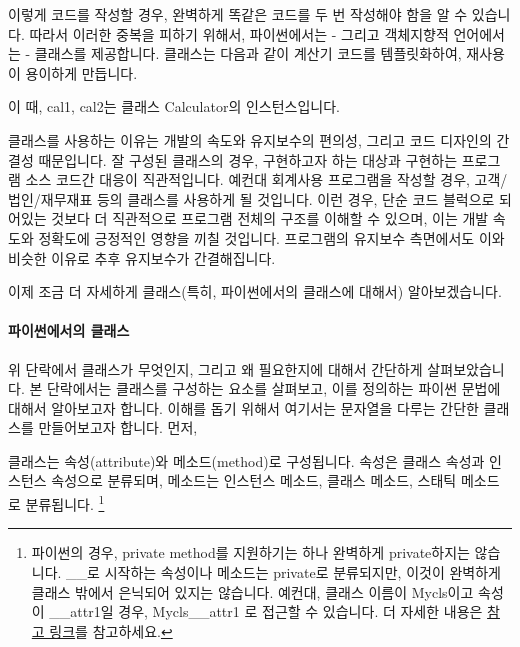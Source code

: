 \documentclass[twoside]{article}
\begin{document}


이렇게 코드를 작성할 경우, 완벽하게 똑같은 코드를 두 번 작성해야 함을 알 수 있습니다. 따라서 이러한 중복을 피하기 위해서, 파이썬에서는 - 그리고 객체지향적 언어에서는 - 클래스를 제공합니다. 클래스는 다음과 같이 계산기 코드를 템플릿화하여, 재사용이 용이하게 만듭니다. 




이 때, cal1, cal2는 클래스 Calculator의 인스턴스입니다. 

클래스를 사용하는 이유는 개발의 속도와 유지보수의 편의성, 그리고 코드 디자인의 간결성 때문입니다. 잘 구성된 클래스의 경우, 구현하고자 하는 대상과 구현하는 프로그램 소스 코드간 대응이 직관적입니다. 예컨대 회계사용 프로그램을 작성할 경우, 고객/법인/재무재표 등의 클래스를 사용하게 될 것입니다. 이런 경우, 단순 코드 블럭으로 되어있는 것보다 더 직관적으로 프로그램 전체의 구조를 이해할 수 있으며, 이는 개발 속도와 정확도에 긍정적인 영향을 끼칠 것입니다. 프로그램의 유지보수 측면에서도 이와 비슷한 이유로 추후 유지보수가 간결해집니다. 

이제 조금 더 자세하게 클래스(특히, 파이썬에서의 클래스에 대해서) 알아보겠습니다. 

\paragraph{파이썬에서의 클래스} 

위 단락에서 클래스가 무엇인지, 그리고 왜 필요한지에 대해서 간단하게 살펴보았습니다. 본 단락에서는 클래스를 구성하는 요소를 살펴보고, 이를 정의하는 파이썬 문법에 대해서 알아보고자 합니다. 이해를 돕기 위해서 여기서는 문자열을 다루는 간단한 클래스를 만들어보고자 합니다. 먼저, 

클래스는 속성(attribute)와 메소드(method)로 구성됩니다. 속성은 클래스 속성과 인스턴스 속성으로 분류되며, 메소드는 인스턴스 메소드, 클래스 메소드, 스태틱 메소드로 분류됩니다. \footnote{파이썬의 경우, private method를 지원하기는 하나 완벽하게 private하지는 않습니다. \_\_로 시작하는 속성이나 메소드는 private로 분류되지만, 이것이 완벽하게 클래스 밖에서 은닉되어 있지는 않습니다. 예컨대, 클래스 이름이 Mycls이고 속성이 \_\_attr1일 경우, Mycls\_\_attr1 로 접근할 수 있습니다. 더 자세한 내용은 \href{http://www.diveintopython.net/object\_oriented\_framework/private\_functions.html}{참고 링크}를 참고하세요. } 
\end{document}
